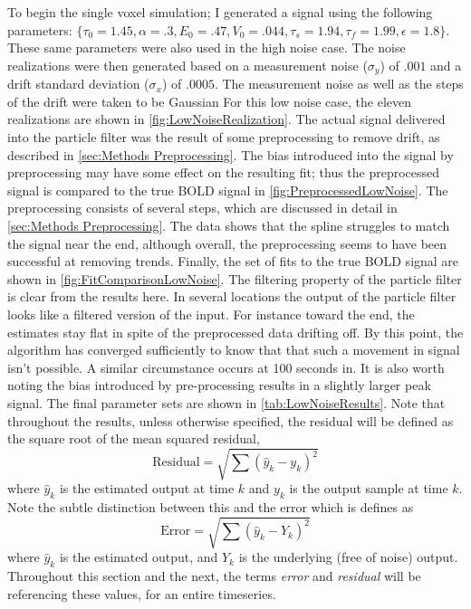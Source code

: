 To begin the single voxel simulation; I generated a signal using the following parameters:
$\{\tau_0 = 1.45, \alpha = .3, E_0 = .47, V_0 = .044, \tau_s = 1.94, \tau_f = 1.99, \epsilon = 1.8\}$.
These same parameters were also used in the high noise case. The noise realizations were
then generated based on a measurement noise ($\sigma_y$) of $.001$ and a drift standard deviation
($\sigma_x$) of $.0005$. The measurement noise as well as the steps of the drift
were taken to be Gaussian
For this low noise case, the eleven realizations are shown in \autoref{fig:LowNoiseRealization}.
The actual signal delivered into the particle filter
was the result of some preprocessing to remove drift, as described in 
\autoref{sec:Methods Preprocessing}. The bias introduced into the signal by preprocessing 
may have some effect on the resulting fit; thus the preprocessed signal is compared
to the true BOLD signal in \autoref{fig:PreprocessedLowNoise}.
The preprocessing consists of several steps, which are discussed in detail in \autoref{sec:Methods Preprocessing}.
The data shows that the spline struggles to match the signal near the end, although 
overall, the preprocessing seems to have been successful at removing trends. Finally, the 
set of fits to the true BOLD signal are shown in \autoref{fig:FitComparisonLowNoise}.
The filtering property of the particle filter is clear from the results here.  In several locations the output
of the particle filter looks like a filtered version of the input. For instance toward the
end, the estimates stay flat in spite of the preprocessed data drifting off. By
this point, the algorithm has converged sufficiently to know that that such a movement in
signal isn't possible. A similar circumstance occurs at 100 seconds in. 
It is also worth noting the bias introduced by pre-processing 
results in a slightly larger peak signal. The final parameter sets are shown in 
\autoref{tab:LowNoiseResults}. Note that throughout the results, unless otherwise specified,
the residual will be defined as the square root of the mean squared residual, 
\begin{equation}
\text{Residual} = \sqrt{\sum (\hat{y}_k - y_k)^2}
\end{equation}
where $\hat{y}_k$ is the estimated output at time $k$ and $y_k$ is the output
sample at time $k$. Note the subtle distinction between this and the error
which is defines as 
\begin{equation}
\text{Error} = \sqrt{\sum (\hat{y}_k - Y_k)^2}
\end{equation}
where $\hat{y}_k$ is the estimated output, and $Y_k$ is the underlying (free of noise)
output. Throughout this section and the next, the terms \emph{error} and \emph{residual}
will be referencing these values, for an entire timeseries.

